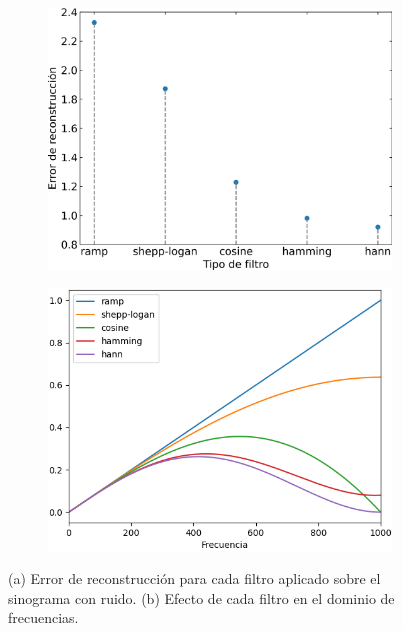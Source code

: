 \documentclass[letterpaper,12pt]{article}
\theoremstyle{plain}
\begin{document}
\begin{figure}[H]
   \centering         
   \begin{subfigure}[h]{0.49\linewidth}
      \centering
      \includegraphics[width=\textwidth]{Figuras/error_vs_filters_noise.png}
      \caption{}
      \label{fig:error_filters_noise}
   \end{subfigure}
   \begin{subfigure}[h]{0.49\linewidth}
      \centering
      \includegraphics[width=\textwidth]{Figuras/comp_filters.png}
      \caption{}
      \label{fig:comp_filters}
   \end{subfigure}
   \caption{(a) Error de reconstrucción para cada filtro aplicado sobre el sinograma con ruido. (b) Efecto de cada filtro en el dominio de frecuencias.}
   \label{fig:filters_noise}
\end{figure}
\end{document}
